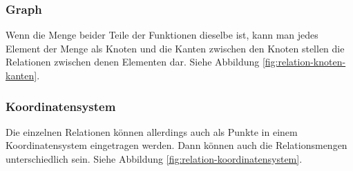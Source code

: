 \subsubsection{Graph}
Wenn die Menge beider Teile der Funktionen dieselbe ist, kann man jedes Element der Menge als Knoten und die Kanten zwischen den Knoten stellen die Relationen zwischen denen Elementen dar. Siehe Abbildung \ref{fig:relation-knoten-kanten}.

\subsubsection{Koordinatensystem}
Die einzelnen Relationen können allerdings auch als Punkte in einem Koordinatensystem eingetragen werden. Dann können auch die Relationsmengen unterschiedlich sein. Siehe Abbildung \ref{fig:relation-koordinatensystem}.


